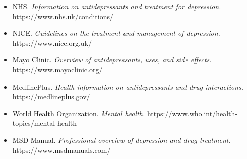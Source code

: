 \begin{itemize}
    \item NHS. \textit{Information on antidepressants and treatment for depression.} https://www.nhs.uk/conditions/
    \item NICE. \textit{Guidelines on the treatment and management of depression.} https://www.nice.org.uk/
    \item Mayo Clinic. \textit{Overview of antidepressants, uses, and side effects.} https://www.mayoclinic.org/
    \item MedlinePlus. \textit{Health information on antidepressants and drug interactions.} https://medlineplus.gov/
    \item World Health Organization. \textit{Mental health.} https://www.who.int/health-topics/mental-health
    \item MSD Manual. \textit{Professional overview of depression and drug treatment.} https://www.msdmanuals.com/
\end{itemize}
